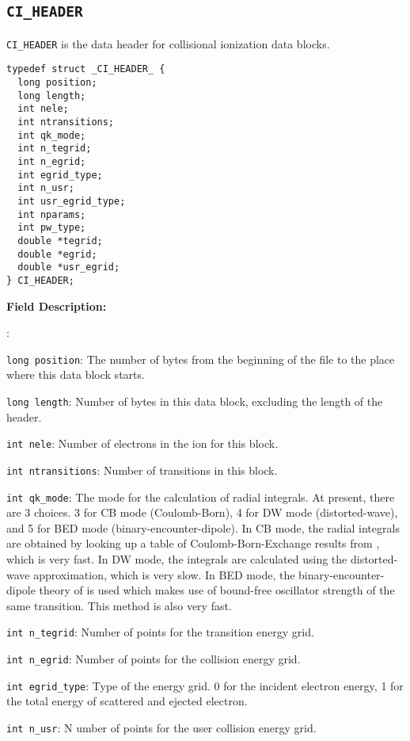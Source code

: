 \documentclass[twoside,letterpaper]{refrep}
\newenvironment{dbdesc}{\textbf{Field Description:} \begin{list}
	{:}{\setlength{\labelwidth}{2in}
	   \setlength{\leftmargin}{2in}
	   \setlength{\labelsep}{0.1in}
	   \setlength{\rightmargin}{0.2in}}}
	{\end{list}}
\begin{document}
\subsection{\texttt{CI\_HEADER}}
\texttt{CI\_HEADER} is the data header for collisional ionization data blocks.

\begin{verbatim}
typedef struct _CI_HEADER_ {
  long position;
  long length;
  int nele;
  int ntransitions;
  int qk_mode;
  int n_tegrid;
  int n_egrid;
  int egrid_type;
  int n_usr;
  int usr_egrid_type;
  int nparams;
  int pw_type;
  double *tegrid;
  double *egrid;
  double *usr_egrid;
} CI_HEADER;
\end{verbatim}

\begin{dbdesc}
\item[\texttt{long position}:] The number of bytes from the beginning of the
file to the place where this data block starts.
\item[\texttt{long length}:] Number of bytes in this data block, excluding the
length of the header.
\item[\texttt{int nele}:] Number of electrons in the ion for this block.
\item[\texttt{int ntransitions}:] Number of transitions in this block.
\item[\texttt{int qk\_mode}:] The mode for the calculation of radial
integrals. At present, there are 3 choices. 3 for CB mode (Coulomb-Born), 4
for DW mode (distorted-wave), and 5 for BED mode (binary-encounter-dipole). In
CB mode, the radial integrals are obtained by looking up a table of
Coulomb-Born-Exchange results from \citet{golden77,golden80}, which is very
fast. In DW mode, the integrals are calculated using the distorted-wave
approximation, which is very slow. In BED mode, the binary-encounter-dipole
theory of \citet{kim94} is used which makes use of bound-free oscillator
strength of the same transition. This method is also very fast.
\item[\texttt{int n\_tegrid}:] Number of points for the transition energy grid.
\item[\texttt{int n\_egrid}:] Number of points for the collision energy grid.
\item[\texttt{int egrid\_type}:] Type of the energy grid. 0 for the incident
electron energy, 1 for the total energy of scattered and ejected electron.
\item[\texttt{int n\_usr}:]N umber of points for the user collision energy
grid.

\end{dbdesc}
\end{document}
